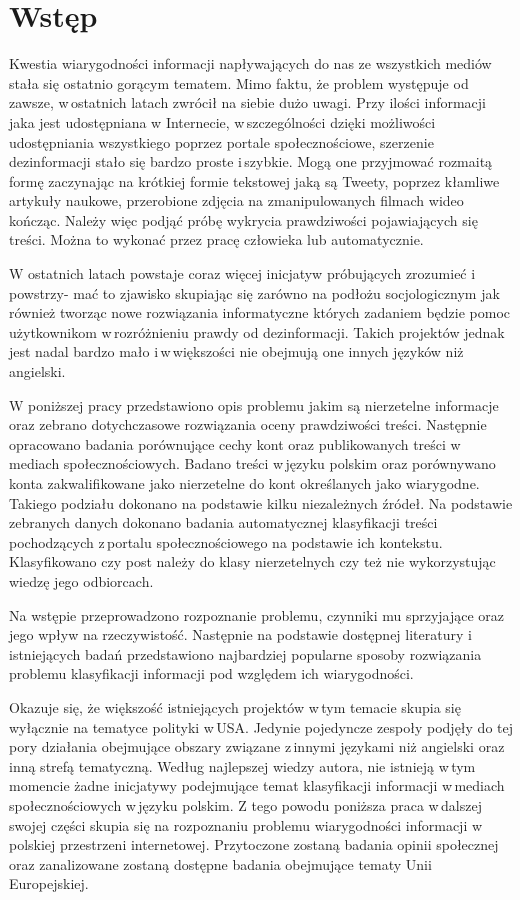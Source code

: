 \newpage %
\section{Wstęp}
Kwestia wiarygodności informacji napływających do nas ze wszystkich mediów stała się ostatnio gorącym tematem. Mimo faktu, że problem występuje od zawsze, w\,ostatnich latach zwrócił na siebie dużo uwagi. Przy ilości informacji jaka jest udostępniana w Internecie, w\,szczególności dzięki możliwości udostępniania wszystkiego poprzez portale społecznościowe, szerzenie dezinformacji stało się bardzo proste i\,szybkie. Mogą one przyjmować rozmaitą formę zaczynając na krótkiej formie tekstowej jaką są Tweety, poprzez kłamliwe artykuły naukowe, przerobione zdjęcia na zmanipulowanych filmach wideo kończąc. Należy więc podjąć próbę wykrycia prawdziwości pojawiających się treści. Można to wykonać przez pracę człowieka lub automatycznie.
\par
W ostatnich latach powstaje coraz więcej inicjatyw próbujących zrozumieć i\,powstrzy- mać to zjawisko skupiając się zarówno na podłożu socjologicznym jak również tworząc nowe rozwiązania informatyczne których zadaniem będzie pomoc użytkownikom w\,rozróżnieniu prawdy od dezinformacji. Takich projektów jednak jest nadal bardzo mało i\,w\,większości nie obejmują one innych języków niż angielski.
\par
W poniższej pracy przedstawiono opis problemu jakim są nierzetelne informacje oraz zebrano dotychczasowe rozwiązania oceny prawdziwości treści. Następnie opracowano badania porównujące cechy kont oraz publikowanych treści w\,mediach społecznościowych. Badano treści w\,języku polskim oraz porównywano konta zakwalifikowane jako nierzetelne do kont określanych jako wiarygodne. Takiego podziału dokonano na podstawie kilku niezależnych źródeł. Na podstawie zebranych danych dokonano badania automatycznej klasyfikacji treści pochodzących z\,portalu społecznościowego na podstawie ich kontekstu. Klasyfikowano czy post należy do klasy nierzetelnych czy też nie wykorzystując wiedzę jego odbiorcach.
\par
Na wstępie przeprowadzono rozpoznanie problemu, czynniki mu sprzyjające oraz jego wpływ na rzeczywistość. Następnie na podstawie dostępnej literatury i\,istniejących badań przedstawiono najbardziej popularne sposoby rozwiązania problemu klasyfikacji informacji pod względem ich wiarygodności. 
\par
Okazuje się, że większość istniejących projektów w\,tym temacie skupia się wyłącznie na tematyce polityki w\,USA. Jedynie pojedyncze zespoły podjęły do tej pory działania obejmujące obszary związane z\,innymi językami niż angielski oraz inną strefą tematyczną. Według najlepszej wiedzy autora, nie istnieją w\,tym momencie żadne inicjatywy podejmujące temat klasyfikacji informacji w\,mediach społecznościowych w\,języku polskim. Z tego powodu poniższa praca w\,dalszej swojej części skupia się na rozpoznaniu problemu wiarygodności informacji w\,polskiej przestrzeni internetowej. Przytoczone zostaną badania opinii społecznej oraz zanalizowane zostaną dostępne badania obejmujące tematy Unii Europejskiej. 
